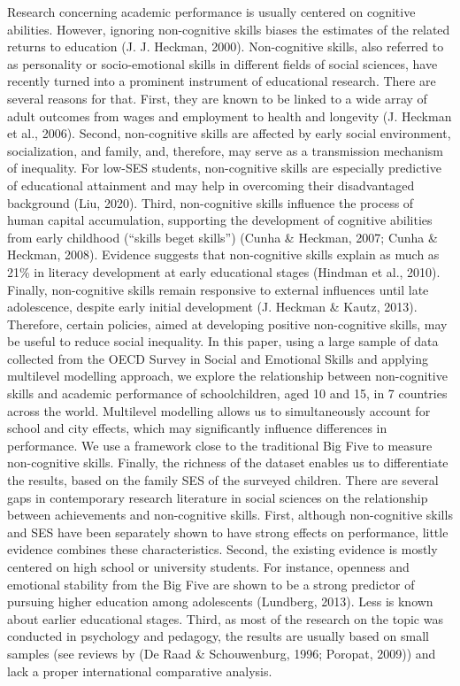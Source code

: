 \documentclass{article}
\begin{document}
Research concerning academic performance is usually centered on
cognitive abilities. However, ignoring non-cognitive skills biases the
estimates of the related returns to education (J. J. Heckman, 2000).
Non-cognitive skills, also referred to as personality or socio-emotional
skills in different fields of social sciences, have recently turned into
a prominent instrument of educational research. There are several
reasons for that. First, they are known to be linked to a wide array of
adult outcomes from wages and employment to health and longevity (J.
Heckman et al., 2006). Second, non-cognitive skills are affected by
early social environment, socialization, and family, and, therefore, may
serve as a transmission mechanism of inequality. For low-SES students,
non-cognitive skills are especially predictive of educational attainment
and may help in overcoming their disadvantaged background (Liu, 2020).
Third, non-cognitive skills influence the process of human capital
accumulation, supporting the development of cognitive abilities from
early childhood (``skills beget skills'') (Cunha \& Heckman, 2007; Cunha
\& Heckman, 2008). Evidence suggests that non-cognitive skills explain
as much as 21\% in literacy development at early educational stages
(Hindman et al., 2010). Finally, non-cognitive skills remain responsive
to external influences until late adolescence, despite early initial
development (J. Heckman \& Kautz, 2013). Therefore, certain policies,
aimed at developing positive non-cognitive skills, may be useful to
reduce social inequality. In this paper, using a large sample of data
collected from the OECD Survey in Social and Emotional Skills and
applying multilevel modelling approach, we explore the relationship
between non-cognitive skills and academic performance of schoolchildren,
aged 10 and 15, in 7 countries across the world. Multilevel modelling
allows us to simultaneously account for school and city effects, which
may significantly influence differences in performance. We use a
framework close to the traditional Big Five to measure non-cognitive
skills. Finally, the richness of the dataset enables us to differentiate
the results, based on the family SES of the surveyed children. There are
several gaps in contemporary research literature in social sciences on
the relationship between achievements and non-cognitive skills. First,
although non-cognitive skills and SES have been separately shown to have
strong effects on performance, little evidence combines these
characteristics. Second, the existing evidence is mostly centered on
high school or university students. For instance, openness and emotional
stability from the Big Five are shown to be a strong predictor of
pursuing higher education among adolescents (Lundberg, 2013). Less is
known about earlier educational stages. Third, as most of the research
on the topic was conducted in psychology and pedagogy, the results are
usually based on small samples (see reviews by (De Raad \& Schouwenburg,
1996; Poropat, 2009)) and lack a proper international comparative
analysis.
\end{document}
